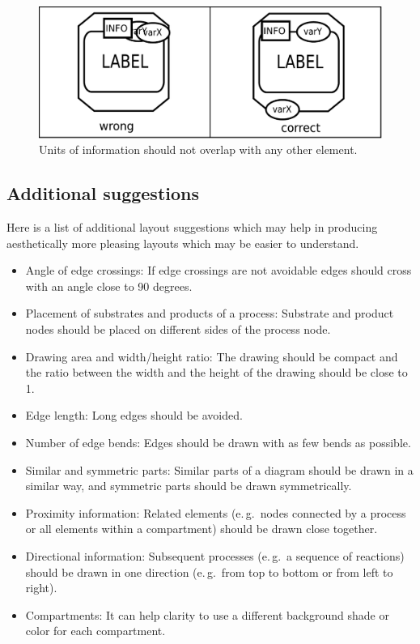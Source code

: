 \begin{figure}[h!]
  \centering
  \includegraphics[scale=0.5]{images/layout-unit-information}
  \caption{Units of information should not overlap with any
  other element.}\label{fig:layout7}
\end{figure}

\subsection{Additional suggestions}

Here is a list of additional layout suggestions which may help in
producing aesthetically more pleasing layouts which may be easier to
understand.

\begin{itemize}
  \item Angle of edge crossings: If edge crossings are not avoidable
  edges should cross with an angle close to 90 degrees.
  \item Placement of substrates and products of a process:
  Substrate and product nodes should be placed
  on different sides of the process node.
  \item Drawing area and width/height ratio: The drawing should
  be compact and the ratio between the width and the height
  of the drawing should be close to 1.
  \item Edge length: Long edges should be avoided.
  \item Number of edge bends: Edges should be drawn with
  as few bends as possible.
  \item Similar and symmetric parts: Similar parts of a diagram
  should be drawn in a similar way, and symmetric parts
  should be drawn symmetrically.
  \item Proximity information: Related elements (e.\,g.~nodes
  connected by a process or all elements within a compartment)
  should be drawn close together.
  \item Directional information: Subsequent processes (e.\,g.~a sequence
  of reactions) should be drawn in one direction (e.\,g.~from
  top to bottom or from left to right).
  \item Compartments: It can help clarity to use a different background shade or color for each compartment.
\end{itemize}
